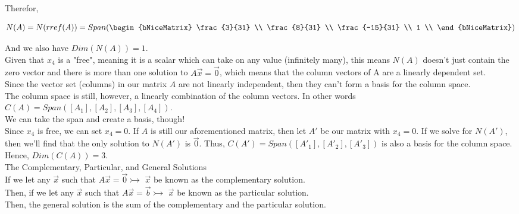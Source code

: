 Therefor,

\[
N(A) = N(rref(A)) =
%
Span(
%
\begin{bNiceMatrix}
	\frac{3}{31} \\
	\frac{8}{31} \\
	\frac{-15}{31} \\
	1 \\
\end{bNiceMatrix}
%
)
\]

And we also have $Dim(N(A)) = 1$.
\\

Given that $x_4$ is a "free", meaning it is a scalar which can take on any value (infinitely many), this means $N(A)$ doesn't just contain the zero vector and there is more than one solution to $A\vec{x} = \vec{0}$, which means that the column vectors of A are a linearly dependent set.
\\

Since the vector set (columns) in our matrix $A$ are not linearly independent, then they can't form a basis for the column space.
\\

The column space is still, however, a linearly combination of the column vectors. In other words $C(A) = Span([A_1], [A_2], [A_3], [A_4])$.
\\

We can take the span and create a basis, though!
\\

Since $x_4$ is free, we can set $x_4 = 0$. If $A$ is still our aforementioned matrix, then let $A'$ be our matrix with $x_4 = 0$. If we solve for $N(A')$, then we'll find that the only solution to $N(A')$ is $\vec{0}$. Thus, $C(A') = Span([A'_1], [A'_2], [A'_3])$ is also a basis for the column space. Hence, $Dim(C(A)) = 3$.
\\

The Complementary, Particular, and General Solutions
\\

If we let any $\vec{x}$ such that $A\vec{x}=\vec{0}\rightarrowtail$ $\vec{x}$ be known as the complementary solution.
\\

Then, if we let any $\vec{x}$ such that $A\vec{x}=\vec{b}\rightarrowtail$ $\vec{x}$ be known as the particular solution.
\\

Then, the general solution is the sum of the complementary and the particular solution.
\\


